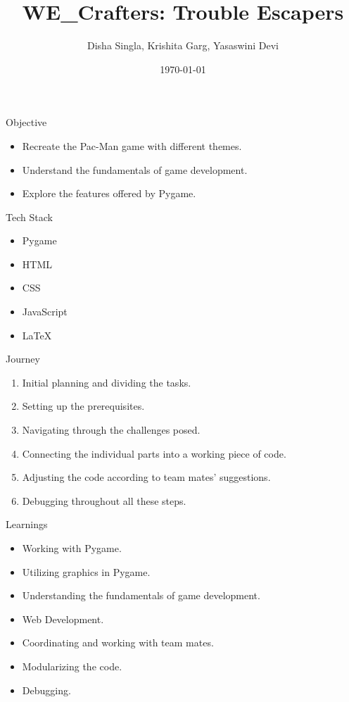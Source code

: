 \documentclass{beamer}
\title{WE\_Crafters: Trouble Escapers}
\author{Disha Singla, Krishita Garg, Yasaswini Devi}
\date{\today}
\begin{document}
\frame{\titlepage}

\begin{frame}{Objective}
    \begin{itemize}
        \item Recreate the Pac-Man game with different themes.
        \item Understand the fundamentals of game development.
        \item Explore the features offered by Pygame.
    \end{itemize}
\end{frame}

\begin{frame}{Tech Stack}
    \begin{itemize}
        \item Pygame
        \item HTML
        \item CSS
        \item JavaScript
        \item LaTeX
    \end{itemize}
\end{frame}

\begin{frame}{Journey}
    \begin{enumerate}
        \item Initial planning and dividing the tasks.
        \item Setting up the prerequisites.
        \item Navigating through the challenges posed.
        \item Connecting the individual parts into a working piece of code.
        \item Adjusting the code according to team mates' suggestions.
        \item Debugging throughout all these steps.
    \end{enumerate}
\end{frame}

\begin{frame}{Learnings}
    \begin{itemize}
        \item Working with Pygame.
        \item Utilizing graphics in Pygame.
        \item Understanding the fundamentals of game development.
	\item Web Development.
        \item Coordinating and working with team mates.
        \item Modularizing the code.
        \item Debugging.
    \end{itemize}
\end{frame}
\end{document}
